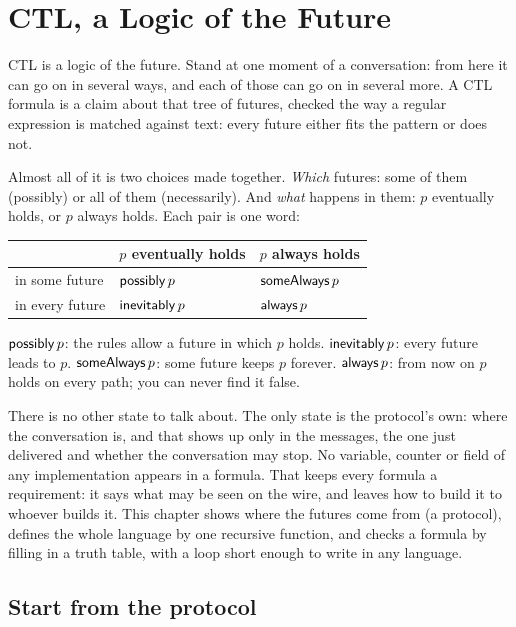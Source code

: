\chapter{CTL, a Logic of the Future}\label{ch:checker}

CTL is a logic of the future. Stand at one moment of a conversation: from here it can go
on in several ways, and each of those can go on in several more. A CTL formula is a claim
about that tree of futures, checked the way a regular expression is matched against text:
every future either fits the pattern or does not.

Almost all of it is two choices made together. \emph{Which} futures: some of them
(possibly) or all of them (necessarily). And \emph{what} happens in them: $p$ eventually
holds, or $p$ always holds. Each pair is one word:

\begin{center}
\begin{tabular}{@{}lll@{}}
\toprule
 & $p$ eventually holds & $p$ always holds \\
\midrule
in some future & $\mathsf{possibly}\, p$ & $\mathsf{someAlways}\, p$ \\
in every future & $\mathsf{inevitably}\, p$ & $\mathsf{always}\, p$ \\
\bottomrule
\end{tabular}
\end{center}

$\mathsf{possibly}\, p$: the rules allow a future in which $p$ holds. $\mathsf{inevitably}\, p$: every future
leads to $p$. $\mathsf{someAlways}\, p$: some future keeps $p$ forever. $\mathsf{always}\, p$: from now on $p$
holds on every path; you can never find it false.

There is no other state to talk about. The only state is the protocol's own: where the
conversation is, and that shows up only in the messages, the one just delivered and
whether the conversation may stop. No variable, counter or field of any implementation
appears in a formula. That keeps every formula a requirement: it says what may be seen on
the wire, and leaves how to build it to whoever builds it.
This chapter shows where the futures come from (a protocol), defines the whole language by
one recursive function, and checks a formula by filling in a truth table, with a loop short
enough to write in any language.

\section{Start from the protocol}\label{sec:ctl}

